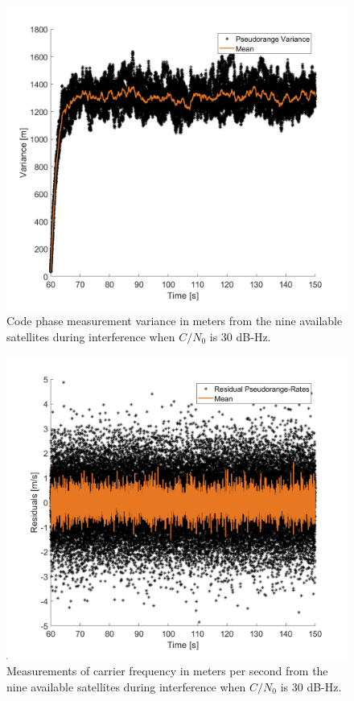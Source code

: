 \documentclass[12pt]{report}
\begin{document}
\begin{figure}[!ht]
  \centering
  \includegraphics[width=0.75\linewidth]{Figures/Results/Scenario1/Case30/codeVariance.png}
  \caption{Code phase measurement variance in meters from the nine available satellites during interference when \(C/N_0\) is \(30\) dB-Hz.}\label{fig:codephaseVariance30}
\end{figure}

\begin{figure}[!ht]
  \centering
  \includegraphics[width=0.75\linewidth]{Figures/Results/Scenario1/Case30/carrierFreq.png}
  \caption{Measurements of carrier frequency in meters per second from the nine available satellites during interference when \(C/N_0\) is \(30\) dB-Hz.}\label{fig:carrier30}
\end{figure}
\end{document}
